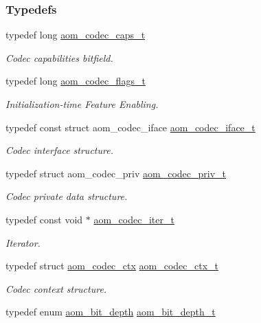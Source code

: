 \subsubsection*{Typedefs}
\begin{DoxyCompactItemize}
\item 
typedef long \hyperlink{group__codec_ga019a4c05cd929e7c50133f6b536eeabf}{aom\+\_\+codec\+\_\+caps\+\_\+t}
\begin{DoxyCompactList}\small\item\em Codec capabilities bitfield. \end{DoxyCompactList}\item 
typedef long \hyperlink{group__codec_ga18f2242c1afca329581fbd3f2c81721b}{aom\+\_\+codec\+\_\+flags\+\_\+t}
\begin{DoxyCompactList}\small\item\em Initialization-\/time Feature Enabling. \end{DoxyCompactList}\item 
typedef const struct aom\+\_\+codec\+\_\+iface \hyperlink{group__codec_ga4ef55b44c762836d1550e11921bed403}{aom\+\_\+codec\+\_\+iface\+\_\+t}
\begin{DoxyCompactList}\small\item\em Codec interface structure. \end{DoxyCompactList}\item 
typedef struct aom\+\_\+codec\+\_\+priv \hyperlink{group__codec_ga3671963ca4b3d6c2adbc186c8ed18023}{aom\+\_\+codec\+\_\+priv\+\_\+t}
\begin{DoxyCompactList}\small\item\em Codec private data structure. \end{DoxyCompactList}\item 
typedef const void $\ast$ \hyperlink{group__codec_gadf9e173c9e02788a9999399edab20a02}{aom\+\_\+codec\+\_\+iter\+\_\+t}
\begin{DoxyCompactList}\small\item\em Iterator. \end{DoxyCompactList}\item 
typedef struct \hyperlink{structaom__codec__ctx}{aom\+\_\+codec\+\_\+ctx} \hyperlink{group__codec_ga9a1d27f9742d9f70783e3c6cb849b5b4}{aom\+\_\+codec\+\_\+ctx\+\_\+t}
\begin{DoxyCompactList}\small\item\em Codec context structure. \end{DoxyCompactList}\item 
typedef enum \hyperlink{group__codec_ga6ed0e98eba4651c1ad845e39498e4153}{aom\+\_\+bit\+\_\+depth} \hyperlink{group__codec_ga90c2026e798a669241dc57464472a198}{aom\+\_\+bit\+\_\+depth\+\_\+t}\hypertarget{group__codec_ga90c2026e798a669241dc57464472a198}{}\label{group__codec_ga90c2026e798a669241dc57464472a198}


\end{DoxyCompactItemize}

